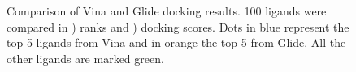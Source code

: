 \documentclass[11pt, letterpaper, titlepage]{article}
\begin{document}
\begin{figure}[htp]
	\centering
	\captionsetup[subfigure]{skip=-15pt,position=top,labelfont=bf,labelformat=parens,singlelinecheck=false}
	\caption{Comparison of Vina and Glide docking results. 100 ligands were compared in  ) ranks and ) docking scores. Dots in blue represent the top 5 ligands from Vina and in orange the top 5 from Glide. All the other ligands are marked green.}\label{fig:comp_glide_vina}
\end{figure}
\end{document}
